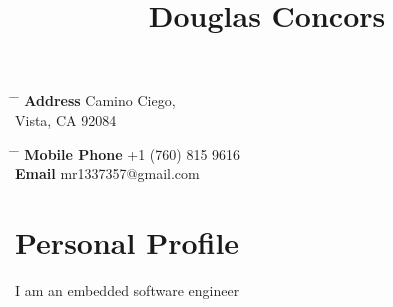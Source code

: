 \documentclass[10pt]{article} %
\begin{document}

\begin{center}
\title{Douglas Concors} %
\end{center}


\parbox{0.5\textwidth}{ %
\begin{tabbing} %
\hspace{3cm} \= \hspace{4cm} \= \kill %
{\bf Address}  Camino Ciego,\\ %
\> Vista, CA 92084 \\ %
\end{tabbing}}
\hfill %
\parbox{0.5\textwidth}{ %
\begin{tabbing} %
\hspace{3cm} \= \hspace{4cm} \= \kill %
{\bf Mobile Phone} \> +1 (760) 815 9616 \\ %
{\bf Email} \> mr1337357@gmail.com \\ %
\end{tabbing}}


\section{Personal Profile}

I am an embedded software engineer

\end{document}
